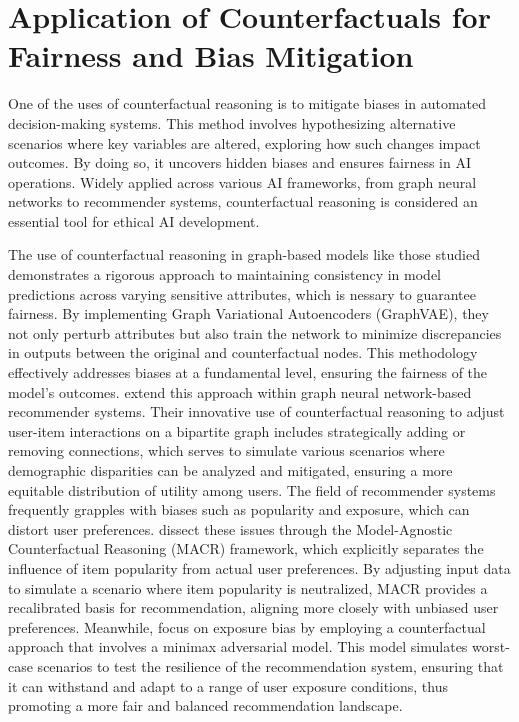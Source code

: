 \section{Application of Counterfactuals for Fairness and Bias Mitigation}

One of the uses of counterfactual reasoning is to mitigate biases in automated
decision-making systems. This method involves hypothesizing alternative scenarios
where key variables are altered, exploring how such changes impact outcomes. By doing
so, it uncovers hidden biases and ensures fairness in AI operations. Widely applied
across various AI frameworks, from graph neural networks to recommender systems,
counterfactual reasoning is considered an essential tool for ethical AI development.

The use of counterfactual reasoning in graph-based models like those studied \textcite{guo_towards_2023}
demonstrates a rigorous approach to maintaining consistency in model predictions
across varying sensitive attributes, which is nessary to guarantee fairness. 
By implementing Graph Variational Autoencoders
(GraphVAE), they not only perturb attributes but also train the network to
minimize discrepancies in outputs between the original and counterfactual nodes.
This methodology effectively addresses biases at a fundamental level, ensuring
the fairness of the model's outcomes. \textcite{medda_gnnuers_2024} extend this
approach within graph neural network-based recommender systems. Their innovative
use of counterfactual reasoning to adjust user-item interactions on a bipartite graph
includes strategically adding or removing connections, which serves to simulate
various scenarios where demographic disparities can be analyzed and mitigated, ensuring
a more equitable distribution of utility among users. The field of recommender
systems frequently grapples with biases such as popularity and exposure, which can
distort user preferences. \textcite{wei_model-agnostic_2021} dissect these issues
through the Model-Agnostic Counterfactual Reasoning (MACR) framework, which
explicitly separates the influence of item popularity from actual user
preferences. By adjusting input data to simulate a scenario where item popularity
is neutralized, MACR provides a recalibrated basis for recommendation, aligning more
closely with unbiased user preferences. Meanwhile, \textcite{xu_adversarial_2020}
focus on exposure bias by employing a counterfactual approach that involves a
minimax adversarial model. This model simulates worst-case scenarios to test the
resilience of the recommendation system, ensuring that it can withstand and
adapt to a range of user exposure conditions, thus promoting a more fair and balanced
recommendation landscape.

